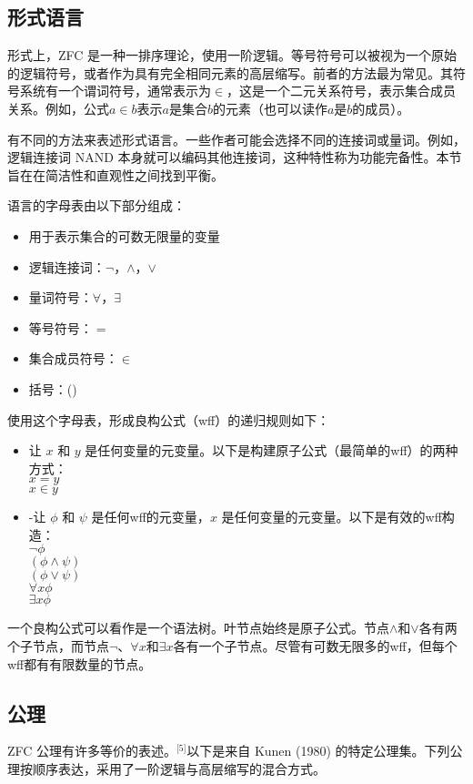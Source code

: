 \subsection{形式语言}  
形式上，ZFC 是一种一排序理论，使用一阶逻辑。等号符号可以被视为一个原始的逻辑符号，或者作为具有完全相同元素的高层缩写。前者的方法最为常见。其符号系统有一个谓词符号，通常表示为\(\in\)，这是一个二元关系符号，表示集合成员关系。例如，公式\(a \in b\)表示\(a\)是集合\(b\)的元素（也可以读作\(a\)是\(b\)的成员）。

有不同的方法来表述形式语言。一些作者可能会选择不同的连接词或量词。例如，逻辑连接词 NAND 本身就可以编码其他连接词，这种特性称为功能完备性。本节旨在在简洁性和直观性之间找到平衡。

语言的字母表由以下部分组成：
\begin{itemize}
\item 用于表示集合的可数无限量的变量
\item 逻辑连接词：\(\lnot\)，\(\land\)，\(\lor\)
\item 量词符号：\(\forall\)，\(\exists\)
\item 等号符号：\(=\)
\item 集合成员符号：\(\in\)
\item 括号：()
\end{itemize}
使用这个字母表，形成良构公式（wff）的递归规则如下：
\begin{itemize}
\item 让 \(x\) 和 \(y\) 是任何变量的元变量。以下是构建原子公式（最简单的wff）的两种方式：\\
\(x = y\)\\
\(x \in y\)\\
\end{itemize}
\begin{itemize}
\item -让 \(\phi\) 和 \(\psi\) 是任何wff的元变量，\(x\) 是任何变量的元变量。以下是有效的wff构造：\\
\(\lnot \phi\)\\
\((\phi \land \psi)\)\\
\((\phi \lor \psi)\)\\
\(\forall x \phi\)\\
\(\exists x \phi\)
\end{itemize}
一个良构公式可以看作是一个语法树。叶节点始终是原子公式。节点\(\land\)和\(\lor\)各有两个子节点，而节点\(\lnot\)、\(\forall x\)和\(\exists x\)各有一个子节点。尽管有可数无限多的wff，但每个wff都有有限数量的节点。
\subsection{公理}  
ZFC 公理有许多等价的表述。\(^\text{[5]}\)以下是来自 Kunen (1980) 的特定公理集。下列公理按顺序表达，采用了一阶逻辑与高层缩写的混合方式。

